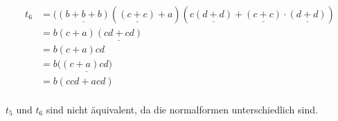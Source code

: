 \begin{align*}
t_6&=(\underline{(b+b+b)}(\underline{(c+c)}+a) (c\underline{(d+d)}+\underline{(c+c)}\cdot \underline{(d+d)})\\
&=b(c+a) \underline{(cd+cd)}\\
&=b(c+a)cd\\
&=b(\underline{(c+a)cd)}\\
&=b(ccd +acd)\\
\end{align*}

$t_5$ und $t_6$ sind nicht äquivalent, da die normalformen unterschiedlich sind.

